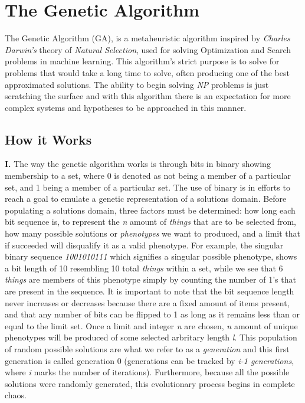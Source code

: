 \section{The Genetic Algorithm}
\label{sec: the genetic algorithm}

The Genetic Algorithm (GA), is a metaheuristic algorithm inspired by \emph{Charles Darwin's} theory of \emph{Natural Selection}, used for solving Optimization and Search problems in machine learning. This algorithm's strict purpose is to solve for problems that would take a long time to solve, often producing one of the best approximated solutions. The ability to begin solving \emph{NP} problems is just scratching the surface and with this algorithm there is an expectation for more complex systems and hypotheses to be approached in this manner.

\subsection{How it Works}
\label{sec: how it works} 

\textbf{I.} The way the genetic algorithm works is through bits in binary showing membership to a set, where 0 is denoted as not being a member of a particular set, and 1 being a member of a particular set. The use of binary is in efforts to reach a goal to emulate a genetic representation of a solutions domain. 
Before populating a solutions domain, three factors must be determined: how long each bit sequence is, to represent the \emph{n}  amount of \emph{things} that are to be selected from, how many possible solutions or \emph{phenotypes} we want to produced, and a limit that if succeeded will disqualify it as a valid phenotype. For example, the singular binary sequence \emph{1001010111} which signifies a singular possible phenotype, shows a bit length of 10 resembling 10 total \emph{things} within a set, while we see that 6 \emph{things} are members of this phenotype simply by counting the number of 1's that are present in the sequence. It is important to note that the bit sequence length never increases or decreases because there are a fixed amount of items present, and that any number of bits can be flipped to 1 as long as it remains less than or equal to the limit set. Once a limit and integer \emph{n} are chosen, \emph{n} amount of unique phenotypes will be produced of some selected arbritary length \emph{l}. This population of random possible solutions are what we refer to as a \emph{generation} and this first generation is called generation 0 (generations can be tracked by \emph{i-1 generations}, where \emph{i} marks the number of iterations). Furthermore, because all the possible solutions were randomly generated, this evolutionary process begins in complete chaos.

